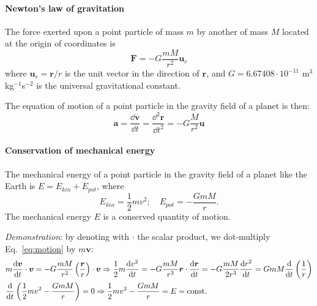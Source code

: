 \paragraph{Newton's law of gravitation}

The force exerted upon a point particle of mass $m$ by another of mass $M$ 
located at the origin of coordinates is
%
\begin{equation}
\bm F = - G \frac{mM}{r^2} \bm u_r
\end{equation}
%
where $\bm u_r = \bm r/r$ is the unit vector in the direction of $\bm r$, and
$G=6.67408\cdot 10^{-11}$ m$^3$kg$^{-1}$s$^{-2}$ is the universal 
gravitational constant.

The equation of motion of a point particle in the gravity field of a planet is
then:
%
\begin{equation}
\bm a = \frac{\dd \bm v}{\dd t} = \frac{\dd^2 \bm r}{\dd t^2} = - G\frac{M}{r^2}\bm u
\label{eq:motion}
\end{equation}

\paragraph{Conservation of mechanical energy}

The mechanical energy of a point particle in the gravity field of a planet 
like the Earth is $E = E_{kin}+E_{pot}$, where 
%
\begin{equation}
E_{kin}=\frac{1}{2}mv^2; \quad E_{pot} = -\frac{GmM}{r}.
\end{equation}
%
The mechanical energy $E$ is a conserved quantity of motion. 

\emph{Demonstration}: by denoting with $\cdot$ the scalar product,
we dot-multiply Eq.~\eqref{eq:motion} by $m\bm v$:
%
\begin{align}
&m\frac{\mathrm{d} \bm v}{\mathrm{d} t} \cdot \bm v 
= - G\frac{mM}{r^2}\left(\frac{\bm r}{r}\right) \cdot \bm v
\Rightarrow
\frac{1}{2}m\frac{\mathrm{d} v^2}{\mathrm{d} t}
= - G\frac{mM}{r^3}\bm r \cdot \frac{\mathrm{d} \bm r}{\mathrm{d} t} 
= - G\frac{mM}{2r^3}\frac{\mathrm{d} r^2}{\mathrm{d} t} 
= GmM\frac{\mathrm{d} }{\mathrm{d} t} \left(\frac{1}{r}\right)
\\
&\frac{\mathrm{d} }{\mathrm{d} t} \left(\frac{1}{2}mv^2 -\frac{GmM}{r}\right) = 0
\Rightarrow
\frac{1}{2}mv^2 -\frac{GmM}{r} = E = \text{const}.
\end{align}

